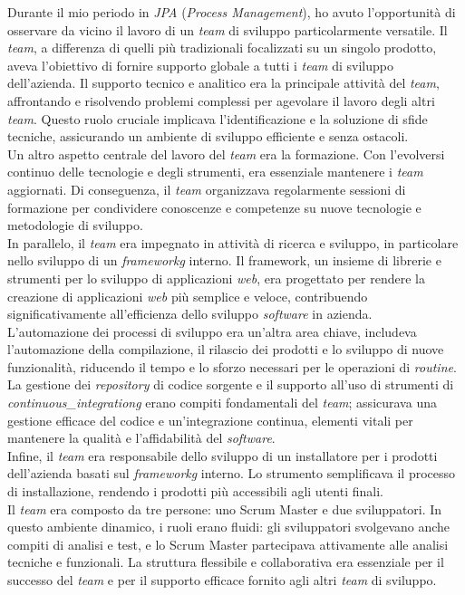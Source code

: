 Durante il mio periodo in \textit{JPA} (\textit{Process Management}), ho avuto l'opportunità di osservare da vicino il lavoro di un \textit{team} di sviluppo particolarmente versatile. 
Il \textit{team}, a differenza di quelli più tradizionali focalizzati su un singolo prodotto, aveva l'obiettivo di fornire supporto globale a tutti i \textit{team} di sviluppo dell'azienda.
\noindent Il supporto tecnico e analitico era la principale attività del \textit{team}, affrontando e risolvendo problemi complessi per agevolare il lavoro degli altri \textit{team}. 
Questo ruolo cruciale implicava l'identificazione e la soluzione di sfide tecniche, assicurando un ambiente di sviluppo efficiente e senza ostacoli. \\
\noindent Un altro aspetto centrale del lavoro del \textit{team} era la formazione. Con l'evolversi continuo delle tecnologie e degli strumenti, era essenziale mantenere i \textit{team} aggiornati. Di conseguenza, il \textit{team} organizzava regolarmente sessioni di formazione per condividere conoscenze e competenze su nuove tecnologie e metodologie di sviluppo. \\
\noindent In parallelo, il \textit{team} era impegnato in attività di ricerca e sviluppo, in particolare nello sviluppo di un \textit{\gls{frameworkg}} interno. Il framework, un insieme di librerie e strumenti per lo sviluppo di applicazioni \textit{web}, era progettato per rendere la creazione di applicazioni \textit{web} più semplice e veloce, contribuendo significativamente all'efficienza dello sviluppo \textit{software} in azienda. \\
\noindent L'automazione dei processi di sviluppo era un'altra area chiave, includeva l'automazione della compilazione, il rilascio dei prodotti e lo sviluppo di nuove funzionalità, riducendo il tempo e lo sforzo necessari per le operazioni di \textit{routine}. \\
\noindent La gestione dei \textit{\gls{repository}} di codice sorgente e il supporto all'uso di strumenti di \textit{\gls{continuous_integrationg}} erano compiti fondamentali del \textit{team}; assicurava una gestione efficace del codice e un'integrazione continua, elementi vitali per mantenere la qualità e l'affidabilità del \textit{software}. \\
\noindent Infine, il \textit{team} era responsabile dello sviluppo di un installatore per i prodotti dell'azienda basati sul \textit{\gls{frameworkg}} interno. Lo strumento semplificava il processo di installazione, rendendo i prodotti più accessibili agli utenti finali. \\
\noindent Il \textit{team} era composto da tre persone: uno \gls{Scrum Master} e due sviluppatori. In questo ambiente dinamico, i ruoli erano fluidi: gli sviluppatori svolgevano anche compiti di analisi e test, e lo \gls{Scrum Master} partecipava attivamente alle analisi tecniche e funzionali. La struttura flessibile e collaborativa era essenziale per il successo del \textit{team} e per il supporto efficace fornito agli altri \textit{team} di sviluppo. \\

